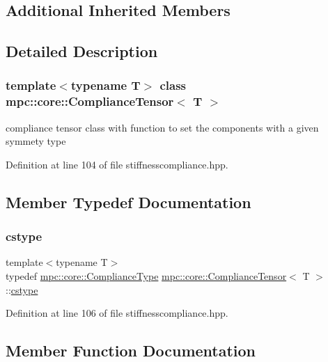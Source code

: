 \subsection*{Additional Inherited Members}


\subsection{Detailed Description}
\subsubsection*{template$<$typename T$>$\newline
class mpc\+::core\+::\+Compliance\+Tensor$<$ T $>$}

compliance tensor class with function to set the components with a given symmety type 

Definition at line 104 of file stiffnesscompliance.\+hpp.



\subsection{Member Typedef Documentation}
\mbox{\label{structmpc_1_1core_1_1_compliance_tensor_a354022edff660abd91a04856798d6d0e}} 
\subsubsection{\texorpdfstring{cstype}{cstype}}
{\footnotesize\ttfamily template$<$typename T$>$ \\
typedef \mbox{\hyperlink{structmpc_1_1core_1_1_compliance_type}{mpc\+::core\+::\+Compliance\+Type}} \mbox{\hyperlink{structmpc_1_1core_1_1_compliance_tensor}{mpc\+::core\+::\+Compliance\+Tensor}}$<$ T $>$\+::\mbox{\hyperlink{structmpc_1_1core_1_1_compliance_tensor_a354022edff660abd91a04856798d6d0e}{cstype}}}



Definition at line 106 of file stiffnesscompliance.\+hpp.



\subsection{Member Function Documentation}
\mbox{\label{structmpc_1_1core_1_1_compliance_tensor_a47139bd25ba7fa9724b9ea87fc22ea3c}} 
